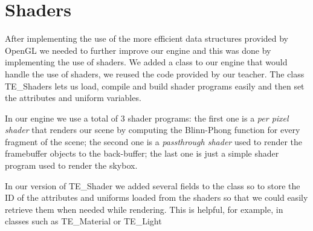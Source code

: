 \documentclass[a4paper]{report}
\begin{document}
\section{Shaders}
After implementing the use of the more efficient data structures provided by OpenGL we needed to further improve our engine and this was done by implementing the use of shaders. We added a class to our engine that would handle the use of shaders, we reused the code provided by our teacher. The class TE\_Shaders lets us load, compile and build shader programs easily and then set the attributes and uniform variables.

In our engine we use a total of 3 shader programs: the first one is a \emph{per pixel shader} that renders our scene by computing the Blinn-Phong function for every fragment of the scene; the second one is a \emph{passthrough shader} used to render the framebuffer objects to the back-buffer; the last one is just a simple shader program used to render the skybox.

In our version of TE\_Shader we added several fields to the class so to store the ID of the attributes and uniforms loaded from the shaders so that we could easily retrieve them when needed while rendering. This is helpful, for example, in classes such as TE\_Material or TE\_Light
\end{document}
